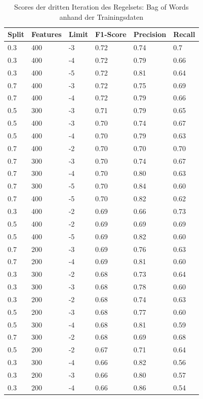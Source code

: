 \FloatBarrier
\begin{table}
	\caption{Scores der dritten Iteration des Regelsets: Bag of Words anhand der Trainingsdaten}
	\centering
	\label{tab:bow3}
	\begin{tabular}{ | l | l | l | l | l | l | }
		\hline
		Split & Features & Limit & F1-Score & Precision & Recall \\ \hline
		0.3 & 400 & -3 & 0.72 & 0.74 & 0.7 \\ 
		0.3 & 400 & -4 & 0.72 & 0.79 & 0.66 \\
		0.3 & 400 & -5 & 0.72 & 0.81 & 0.64 \\
		0.7 & 400 & -3 & 0.72 & 0.75 & 0.69 \\
		0.7 & 400 & -4 & 0.72 & 0.79 & 0.66 \\
		0.5 & 300 & -3 & 0.71 & 0.79 & 0.65 \\
		0.5 & 400 & -3 & 0.70 & 0.74 & 0.67 \\
		0.5 & 400 & -4 & 0.70 & 0.79 & 0.63 \\ 
		0.7 & 400 & -2 & 0.70 & 0.70 & 0.70 \\ 
		0.7 & 300 & -3 & 0.70 & 0.74 & 0.67 \\
		0.7 & 300 & -4 & 0.70 & 0.80 & 0.63 \\
		0.7 & 300 & -5 & 0.70 & 0.84 & 0.60 \\
		0.7 & 400 & -5 & 0.70 & 0.82 & 0.62 \\ 
		0.3 & 400 & -2 & 0.69 & 0.66 & 0.73 \\ 
		0.5 & 400 & -2 & 0.69 & 0.69 & 0.69 \\ 
		0.5 & 400 & -5 & 0.69 & 0.82 & 0.60 \\ 
		0.7 & 200 & -3 & 0.69 & 0.76 & 0.63 \\ 
		0.7 & 200 & -4 & 0.69 & 0.81 & 0.60 \\ 
		0.3 & 300 & -2 & 0.68 & 0.73 & 0.64 \\ 
		0.3 & 300 & -3 & 0.68 & 0.78 & 0.60 \\ 
		0.3 & 200 & -2 & 0.68 & 0.74 & 0.63 \\ 
		0.5 & 200 & -3 & 0.68 & 0.77 & 0.60 \\ 
		0.5 & 300 & -4 & 0.68 & 0.81 & 0.59 \\ 
		0.7 & 300 & -2 & 0.68 & 0.69 & 0.68 \\ 
		0.5 & 200 & -2 & 0.67 & 0.71 & 0.64 \\ 
		0.3 & 300 & -4 & 0.66 & 0.82 & 0.56 \\ 
		0.3 & 200 & -3 & 0.66 & 0.80 & 0.57 \\
		0.3 & 200 & -4 & 0.66 & 0.86 & 0.54 \\

\end{tabular}
\end{table}
